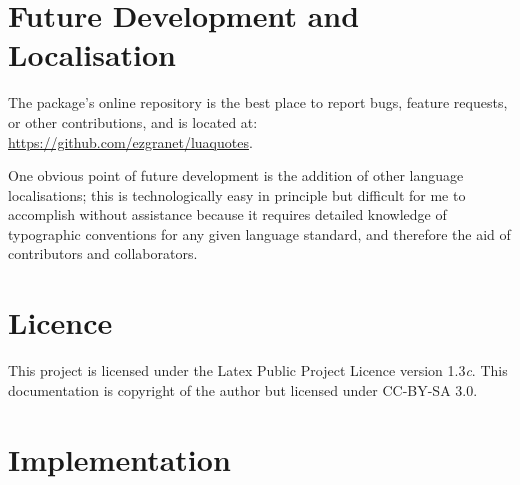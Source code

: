 \documentclass{article}
\begin{document}
	
	
	
	\section{Future Development and Localisation}
	The package's online repository is the best place to report bugs, feature requests, or other contributions, and is located at: \\\url{https://github.com/ezgranet/luaquotes}. 
	
	One obvious point of future development is the addition of other language localisations; this is technologically easy in principle but difficult for me to accomplish without assistance because it requires detailed knowledge of typographic conventions for any given language standard, and therefore the aid of contributors and collaborators.  	\section{Licence}
	This project is licensed under the Latex Public Project Licence version 1.3\textit{c}. This documentation is copyright of the author but licensed under CC-BY-SA 3.0. 
	
	
	\clearpage\section{Implementation}
	
\end{document}
